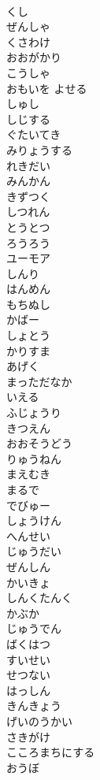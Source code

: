 \documentclass[8pt]{extreport}
\begin{document}
\begin{CJK}{UTF8}{min}
\\	くし
\\	ぜんしゃ
\\	くさわけ
\\	おおがかり
\\	こうしゃ
\\	おもいを よせる
\\	しゅし
\\	しじする
\\	ぐたいてき
\\	みりょうする
\\	れきだい
\\	みんかん
\\	きずつく
\\	しつれん
\\	とうとつ
\\	ろうろう
\\	ユーモア
\\	しんり
\\	はんめん
\\	もちぬし
\\	かばー
\\	しょとう
\\	かりすま
\\	あげく
\\	まっただなか
\\	いえる
\\	ふじょうり
\\	きつえん
\\	おおそうどう
\\	りゅうねん
\\	まえむき
\\	まるで
\\	でびゅー
\\	しょうけん
\\	へんせい
\\	じゅうだい
\\	ぜんしん
\\	かいきょ
\\	しんくたんく
\\	かぶか
\\	じゅうでん
\\	ばくはつ
\\	すいせい
\\	せつない
\\	はっしん
\\	きんきょう
\\	げいのうかい
\\	さきがけ
\\	こころまちにする
\\	おうぼ

\end{CJK}
\end{document}
